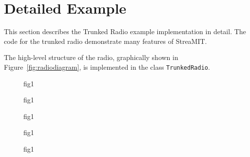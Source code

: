 \section{Detailed Example}
This section describes the Trunked Radio example implementation in
detail. The code for the trunked radio demonstrate many features of
StreaMIT. 

The high-level structure of the radio, graphically shown in
Figure~\ref{fig:radiodiagram}, is implemented in the class {\tt TrunkedRadio}.




\begin{figure}
\centering
{}
\caption{ fig1}
\label{fig:data_structs}
\end{figure}

\begin{figure*}
\centering
{}
\caption{ fig1}
\label{fig:data_structs}
\end{figure*}

\begin{figure*}
\centering
{}
\caption{ fig1}
\label{fig:data_structs}
\end{figure*}

\begin{figure}
\centering
{}
\caption{ fig1}
\label{fig:data_structs}
\end{figure}

\begin{figure*}
\centering
{}
\caption{ fig1}
\label{fig:data_structs}
\end{figure*}


\newpage

